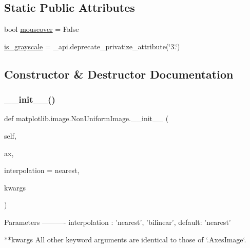 \subsection*{Static Public Attributes}
\begin{DoxyCompactItemize}
\item 
bool \hyperlink{classmatplotlib_1_1image_1_1NonUniformImage_a16710a8217a97f59d82b532d7ca6966c}{mouseover} = False
\item 
\hyperlink{classmatplotlib_1_1image_1_1NonUniformImage_a70f6f5e3933bca0db301a5a508caf273}{is\+\_\+grayscale} = \+\_\+api.\+deprecate\+\_\+privatize\+\_\+attribute(\char`\"{}3.\char`\"{})
\end{DoxyCompactItemize}


\subsection{Constructor \& Destructor Documentation}
\mbox{\label{classmatplotlib_1_1image_1_1NonUniformImage_af3107b6a860dcaba7fb433ccd03e2b98}} 
\subsubsection{\texorpdfstring{\+\_\+\+\_\+init\+\_\+\+\_\+()}{\_\_init\_\_()}}
{\footnotesize\ttfamily def matplotlib.\+image.\+Non\+Uniform\+Image.\+\_\+\+\_\+init\+\_\+\+\_\+ (\begin{DoxyParamCaption}\item[{}]{self,  }\item[{}]{ax,  }\item[{}]{interpolation = {\ttfamily \textquotesingle{}nearest\textquotesingle{}},  }\item[{}]{kwargs }\end{DoxyParamCaption})}

\begin{DoxyVerb}Parameters
----------
interpolation : {'nearest', 'bilinear'}, default: 'nearest'

**kwargs
    All other keyword arguments are identical to those of `.AxesImage`.
\end{DoxyVerb}
 

